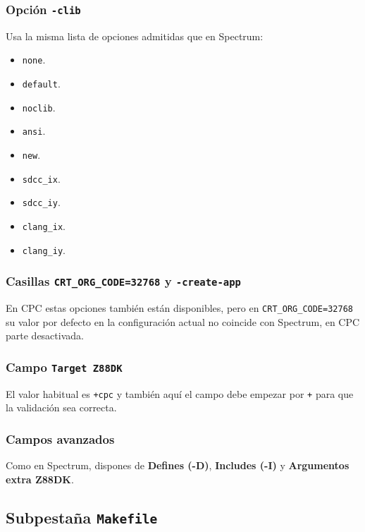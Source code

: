 \documentclass[../../main.tex]{subfiles}
\begin{document}
\subsubsection{Opción \texttt{-clib}}

Usa la misma lista de opciones admitidas que en Spectrum:

\begin{itemize}
    \item \texttt{none}.
    \item \texttt{default}.
    \item \texttt{noclib}.
    \item \texttt{ansi}.
    \item \texttt{new}.
    \item \texttt{sdcc\_ix}.
    \item \texttt{sdcc\_iy}.
    \item \texttt{clang\_ix}.
    \item \texttt{clang\_iy}.
\end{itemize}

\subsubsection{Casillas \texttt{CRT\_ORG\_CODE=32768} y \texttt{-create-app}}

En CPC estas opciones también están disponibles, pero en \texttt{CRT\_ORG\_CODE=32768} su valor por defecto en la configuración actual no coincide con Spectrum, en CPC parte desactivada.

\subsubsection{Campo \texttt{Target Z88DK}}

El valor habitual es \texttt{+cpc} y también aquí el campo debe empezar por \texttt{+} para que la validación sea correcta.

\subsubsection{Campos avanzados}

Como en Spectrum, dispones de \textbf{Defines (-D)}, \textbf{Includes (-I)} y \textbf{Argumentos extra Z88DK}.


\clearpage

\subsection{Subpestaña \texttt{Makefile}}
\end{document}
